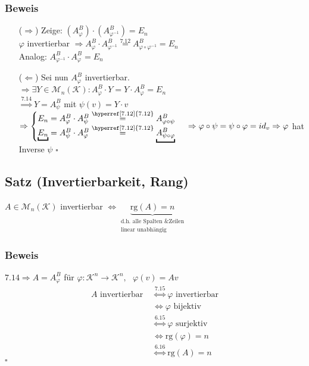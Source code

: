 \documentclass[a4paper, 12pt,titlepage, pdf, headsepline]{article}
\newcommand{\K}{\mathcal{K}}
\newcommand{\M}{\mathcal{M}}
\newcommand{\rg}{\textrm{rg}}
\newcommand{\qed}{\hfill$\square$}
\renewcommand{\>}{\rightarrow}
\renewcommand{\*}{\cdot}
\renewcommand{\phi}{\varphi}
\begin{document}
\subsubsection*{Beweis}
\begin{itemize}
	\item[($\Rightarrow$)] Zeige: $(A_\phi^B) \cdot (A_{\phi^{-1}}^B) = E_n$\\
	$\phi$ invertierbar $\Rightarrow A_\phi^B \cdot A_{\phi^{-1}}^B \overset{\hyperref[7.12]{7.12}}{=} A_{\phi \circ \phi^{-1}}^B = E_n$\\
	Analog: $A_{\phi^{-1}}^B \cdot A_\phi^B = E_n$
	\item[($\Leftarrow$)] Sei nun $A_\phi^B$ invertierbar. \\
	$\Rightarrow \exists Y \in \M_n(\K): A_\phi^B \cdot Y = Y \cdot A_\phi^B = E_n$\\
	$\overset{\hyperref[7.14]{7.14}}{\Rightarrow} Y = A_\psi^B$ mit $\psi(v) = Y\*v$\\
	$\Rightarrow \begin{cases}
	E_n = A_\phi^B \cdot A_\psi^B \overset{\hyperref[7.12]{7.12}}{=} A_{\phi \circ \psi}^B\\
	\underbracket{E_n} = A_\psi^B \cdot A_\phi^B \overset{\hyperref[7.12]{7.12}}{=} \underbracket{A_{\psi \circ \phi}^B}
	\end{cases}\\
	\Rightarrow \phi \circ \psi = \psi \circ \phi = id_v\\
	\Rightarrow \phi$ hat Inverse $\psi$ \qed
\end{itemize}
\subsection{Satz (Invertierbarkeit, Rang)}
\label{7.16}
$A \in \M_n(\K)$ invertierbar $\Leftrightarrow \underbrace{\rg(A) = n}_{\substack{\text{d.h. alle Spalten \& Zeilen}\\\text{linear unabhängig}}}$
\subsubsection*{Beweis}
$\hyperref[7.14]{7.14} \Rightarrow A = A_\phi^B$ für $\phi:\K^n \rightarrow \K^n,~~~ \phi(v) = Av$\\
\begin{align*}
A \text{ invertierbar } &\overset{\hyperref[7.15]{7.15}}{\Leftrightarrow} \phi \text{ invertierbar} \\
&\Leftrightarrow \phi \text{ bijektiv }\\
&\overset{\hyperref[6.15]{6.15}}{\Leftrightarrow} \phi \text{ surjektiv}\\
&\Leftrightarrow \rg(\phi) = n\\
&\overset{\hyperref[6.16]{6.16}}{\Leftrightarrow} \rg(A) = n
\end{align*}
\qed
\end{document}
